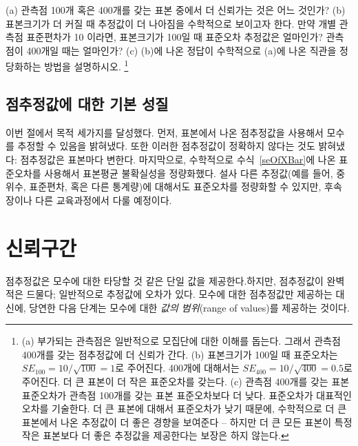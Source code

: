 \begin{exercise}
(a) 관측점 100개 혹은 400개를 갖는 표본 중에서 더 신뢰가는 것은 어느 것인가? (b) 표본크기가 더 커질 때 추정값이 더 나아짐을 수학적으로 보이고자 한다. 만약 개별 관측점 표준편차가 10 이라면, 표본크기가 100일 때 표준오차 추정값은 얼마인가? 관측점이 400개일 때는 얼마인가? (c) (b)에 나온 정답이 수학적으로 (a)에 나온 직관을 정당화하는 방법을 설명하시오.
\footnote{
(a) 부가되는 관측점은 일반적으로 모집단에 대한 이해를 돕는다. 그래서 관측점 400개를 갖는 점추정값에 더 신뢰가 간다. (b) 표본크기가 100일 때 표준오차는 $SE_{100} = 10/\sqrt{100} = 1$로 주어진다. 400개에 대해서는 $SE_{400} = 10/\sqrt{400} = 0.5$로 주어진다. 더 큰 표본이 더 작은 표준오차를 갖는다. (c) 관측점 400개를 갖는 표본 표준오차가 관측점 100개를 갖는 표본 표준오차보다 더 낮다. 표준오차가 대표적인 오차를 기술한다. 더 큰 표본에 대해서 표준오차가 낮기 때문에, 수학적으로 더 큰 표본에서 나온 추정값이 더 좋은 경향을 보여준다 -- 하지만 더 큰 모든 표본이 특정 작은 표본보다 더 좋은 추정값을 제공한다는 보장은 하지 않는다.}
\end{exercise}

\subsection{점추정값에 대한 기본 성질}

이번 절에서 목적 세가지를 달성했다. 먼저, 표본에서 나온 점추정값을 사용해서 모수를 추정할 수 있음을 밝혀냈다. 또한 이러한 점추정값이 정확하지 않다는 것도 밝혀냈다: 점추정값은 표본마다 변한다. 마지막으로, 수학적으로 수식~\eqref{seOfXBar}에 나온 표준오차를 사용해서 표본평균 불확실성을 정량화했다. 설사 다른 추정값(예를 들어, 중위수, 표준편차, 혹은 다른 통계량)에 대해서도 표준오차를 정량화할 수 있지만, 후속 장이나 다른 교육과정에서 다룰 예정이다.



\section[Confidence intervals]{신뢰구간 }
\label{confidenceIntervals}

점추정값은 모수에 대한 타당할 것 같은 단일 값을 제공한다.하지만, 점추정값이 완벽적은 드물다; 일반적으로 추정값에 오차가 있다. 모수에 대한 점추정값만 제공하는 대신에, 당연한 다음 단계는 모수에 대한 \emph{값의 범위}(range of values)를 제공하는 것이다.

